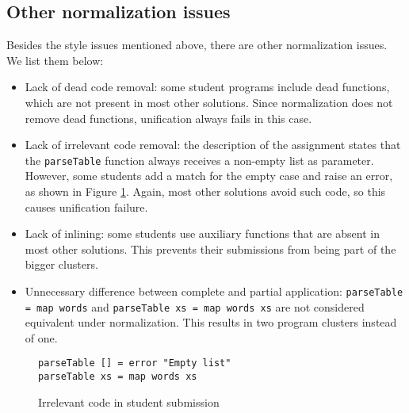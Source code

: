 
\subsection{Other normalization issues}

Besides the style issues mentioned above, there are other normalization issues. We list them below:

\begin{itemize}
    \item Lack of dead code removal: some student programs include dead functions, which are not present in most other solutions. Since normalization does not remove dead functions, unification always fails in this case.
    \item Lack of irrelevant code removal: the description of the assignment states that the \texttt{parseTable} function always receives a non-empty list as parameter. However, some students add a match for the empty case and raise an error, as shown in Figure \ref{fig:irrelevant-code-error}. Again, most other solutions avoid such code, so this causes unification failure.
    \item Lack of inlining: some students use auxiliary functions that are absent in most other solutions. This prevents their submissions from being part of the bigger clusters.
    \item Unnecessary difference between complete and partial application: \texttt{parseTable = map words} and \texttt{parseTable xs = map words xs} are not considered equivalent under normalization. This results in two program clusters instead of one.
\end{itemize}

\begin{figure}[H]
\begin{verbatim}
parseTable [] = error "Empty list"
parseTable xs = map words xs
\end{verbatim}
\caption{Irrelevant code in student submission}
\label{fig:irrelevant-code-error}
\end{figure}



